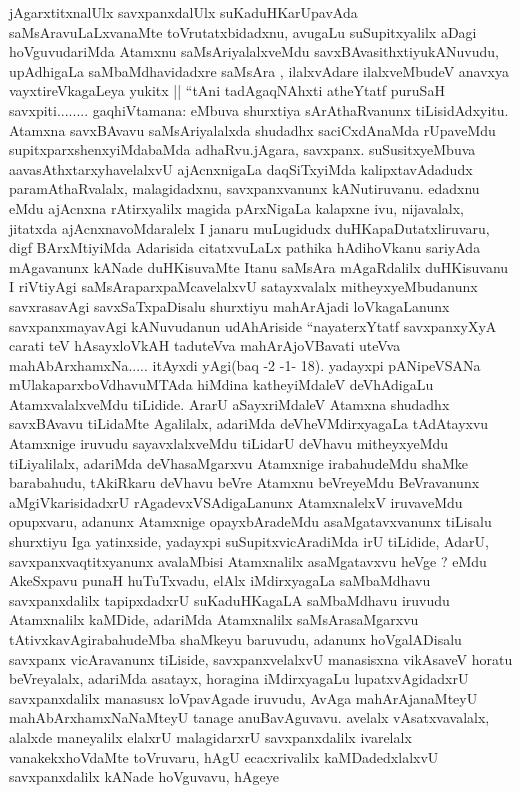 \begin{artha}
jAgarxtitxnalUlx savxpanxdalUlx suKaduHKarUpavAda saMsAravuLaLxvanaMte
toVrutatxbidadxnu, avugaLu suSupitxyalilx aDagi hoVguvudariMda Atamxnu
saMsAriyalalxveMdu savxBAvasithxtiyukANuvudu, upAdhigaLa
saMbaMdhavidadxre saMsAra , ilalxvAdare ilalxveMbudeV anavxya
vayxtireVkagaLeya yukitx || ``tAni tadAgaqNAhxti atheYtatf puruSaH
savxpiti........ gaqhiVtamana: eMbuva shurxtiya sArAthaRvanunx
tiLisidAdxyitu. Atamxna savxBAvavu saMsAriyalalxda shudadhx
saciCxdAnaMda rUpaveMdu supitxparxshenxyiMdabaMda adhaRvu.jAgara,
savxpanx. suSusitxyeMbuva aavasAthxtarxyhavelalxvU ajAcnxnigaLa
daqSiTxyiMda kalipxtavAdadudx paramAthaRvalalx, malagidadxnu,
savxpanxvanunx kANutiruvanu. edadxnu eMdu ajAcnxna rAtirxyalilx magida
pArxNigaLa kalapxne ivu, nijavalalx, jitatxda ajAcnxnavoMdaralelx I
janaru muLugidudx duHKapaDutatxliruvaru, digf BArxMtiyiMda Adarisida
citatxvuLaLx pathika hAdihoVkanu sariyAda mAgavanunx kANade
duHKisuvaMte Itanu saMsAra mAgaRdalilx duHKisuvanu I riVtiyAgi
saMsAraparxpaMcavelalxvU satayxvalalx mitheyxyeMbudanunx savxrasavAgi
savxSaTxpaDisalu shurxtiyu mahArAjadi loVkagaLanunx savxpanxmayavAgi
kANuvudanun udAhAriside ``nayaterxYtatf savxpanxyXyA carati teV
hAsayxloVkAH taduteVva mahArAjoVBavati uteVva
mahAbArxhamxNa..... itAyxdi yAgi(baq -2 -1- 18). yadayxpi pANipeVSANa
mUlakaparxboVdhavuMTAda hiMdina katheyiMdaleV deVhAdigaLu
AtamxvalalxveMdu tiLidide. ArarU aSayxriMdaleV Atamxna shudadhx
savxBAvavu tiLidaMte Agalilalx, adariMda deVheVMdirxyagaLa tAdAtayxvu
Atamxnige iruvudu sayavxlalxveMdu tiLidarU deVhavu mitheyxyeMdu
tiLiyalilalx, adariMda deVhasaMgarxvu Atamxnige irabahudeMdu shaMke
barabahudu, tAkiRkaru deVhavu beVre Atamxnu beVreyeMdu BeVravanunx
aMgiVkarisidadxrU rAgadevxVSAdigaLanunx AtamxnalelxV iruvaveMdu
opupxvaru, adanunx Atamxnige opayxbAradeMdu asaMgatavxvanunx tiLisalu
shurxtiyu Iga yatinxside, yadayxpi suSupitxvicAradiMda irU tiLidide,
AdarU, savxpanxvaqtitxyanunx avalaMbisi Atamxnalilx asaMgatavxvu heVge
? eMdu AkeSxpavu punaH huTuTxvadu, elAlx iMdirxyagaLa saMbaMdhavu
savxpanxdalilx tapipxdadxrU suKaduHKagaLA saMbaMdhavu iruvudu
Atamxnalilx kaMDide, adariMda Atamxnalilx saMsArasaMgarxvu
tAtivxkavAgirabahudeMba shaMkeyu baruvudu, adanunx hoVgalADisalu
savxpanx vicAravanunx tiLiside, savxpanxvelalxvU manasisxna vikAsaveV
horatu beVreyalalx, adariMda asatayx, horagina iMdirxyagaLu
lupatxvAgidadxrU savxpanxdalilx manasusx loVpavAgade iruvudu, AvAga
mahArAjanaMteyU mahAbArxhamxNaNaMteyU tanage anuBavAguvavu. avelalx
vAsatxvavalalx, alalxde maneyalilx elalxrU malagidarxrU
savxpanxdalilx ivarelalx vanakekxhoVdaMte toVruvaru, hAgU
ecacxrivalilx kaMDadedxlalxvU savxpanxdalilx kANade hoVguvavu, hAgeye

\end{artha}
